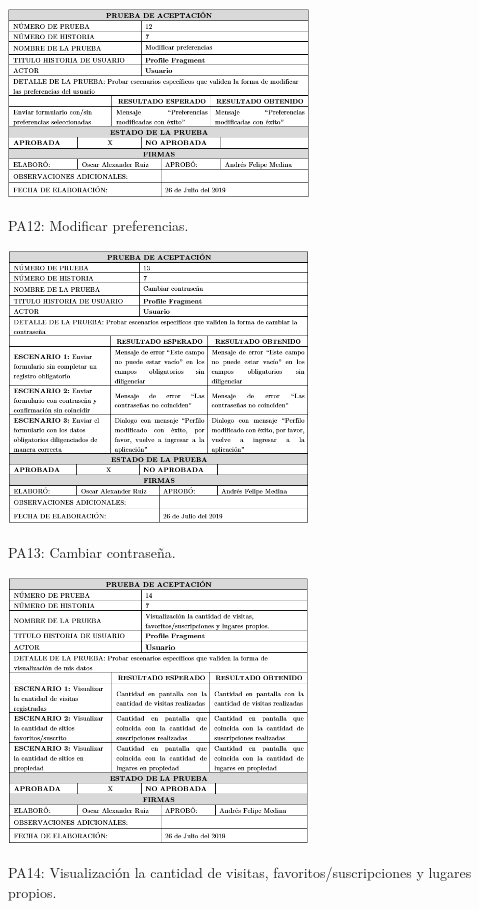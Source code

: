 \documentclass[12pt,letterpaper,openany]{book}
\begin{document}
\begin{table}[H]
\centering
\includegraphics[width=8cm]{./imagenes/PA/PA12}
\caption{PA12: Modificar preferencias.}
\end{table}

\begin{table}[H]
\centering
\includegraphics[width=8cm]{./imagenes/PA/PA13}
\caption{PA13: Cambiar contraseña.}
\end{table}

\begin{table}[H]
\centering
\includegraphics[width=8cm]{./imagenes/PA/PA14}
\caption{PA14: Visualización la cantidad de visitas, favoritos/suscripciones y lugares propios.}
\end{table}
\end{document}
